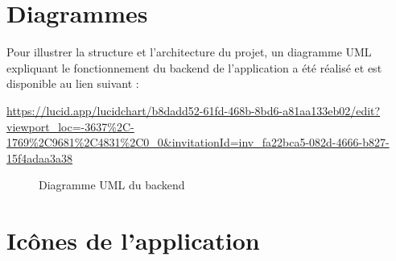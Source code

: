 \documentclass[12pt]{report}
\begin{document}
	\section{Diagrammes}
	\label{diagrams}
	
	Pour illustrer la structure et l’architecture du projet, un diagramme UML expliquant le fonctionnement du backend de l'application a été réalisé et est disponible au lien suivant :
	
	\url{https://lucid.app/lucidchart/b8dadd52-61fd-468b-8bd6-a81aa133eb02/edit?viewport_loc=-3637\%2C-1769\%2C9681\%2C4831\%2C0_0&invitationId=inv_fa22bca5-082d-4666-b827-15f4adaa3a38}
	
	\begin{figure}[H]
		\centering
		\begin{minipage}[t]{0.32\textwidth}
			\centering
			\caption*{Diagramme UML du backend}
		\end{minipage}
		\hfill
		
		
	\end{figure}
	
	
	\section{Icônes de l’application}
	
\end{document}
